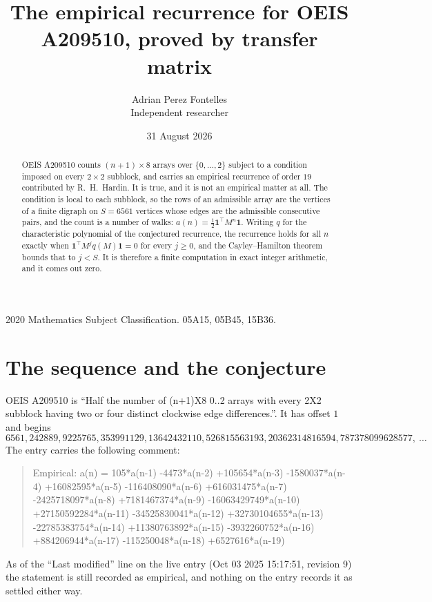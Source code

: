 \documentclass[11pt,a4paper]{article}
\title{The empirical recurrence for OEIS A209510, proved by transfer matrix}
\author{Adrian Perez Fontelles\\ \small Independent researcher}
\date{31 August 2026}
\theoremstyle{plain}
\theoremstyle{definition}
\begin{document}
\maketitle

\begin{abstract}
OEIS A209510 counts $(n+1)\times8$ arrays over $\{0,\dots,2\}$ subject to a condition imposed on
every $2\times2$ subblock, and carries an empirical recurrence of order $19$ contributed
by R.~H.~Hardin. It is true, and it is not an empirical matter at all. The condition is local
to each subblock, so the rows of an admissible array are the vertices of a finite digraph
on $S=6561$ vertices whose edges are the admissible consecutive pairs, and the count is a
number of walks: $a(n)=\tfrac1{2}\mathbf{1}^{\!\top}M^{n}\mathbf{1}$. Writing $q$
for the characteristic polynomial of the conjectured recurrence, the recurrence holds for all
$n$ exactly when $\mathbf{1}^{\!\top}M^{j}q(M)\mathbf{1}=0$ for every $j\ge0$, and the
Cayley--Hamilton theorem bounds that to $j<S$. It is therefore a finite computation in exact
integer arithmetic, and it comes out zero.
\end{abstract}

\noindent\small 2020 Mathematics Subject Classification. 05A15, 05B45, 15B36.\normalsize

\section{The sequence and the conjecture}

OEIS A209510 is ``Half the number of (n+1)X8 0..2 arrays with every 2X2 subblock having two or four distinct clockwise edge differences.''. It has offset $1$ and begins
\[
6561, 242889, 9225765, 353991129, 13642432110, 526815563193, 20362314816594, 787378099628577,\ \dots
\]
The entry carries the following comment:
\begin{quote}\small
Empirical: a(n) = 105*a(n-1) -4473*a(n-2) +105654*a(n-3) -1580037*a(n-4) +16082595*a(n-5) -116408090*a(n-6) +616031475*a(n-7) -2425718097*a(n-8) +7181467374*a(n-9) -16063429749*a(n-10) +27150592284*a(n-11) -34525830041*a(n-12) +32730104655*a(n-13) -22785383754*a(n-14) +11380763892*a(n-15) -3932260752*a(n-16) +884206944*a(n-17) -115250048*a(n-18) +6527616*a(n-19)
\end{quote}
As of the ``Last modified'' line on the live entry (Oct 03 2025 15:17:51, revision 9) the statement is
still recorded as empirical, and nothing on the entry records it as settled either way.
\end{document}
